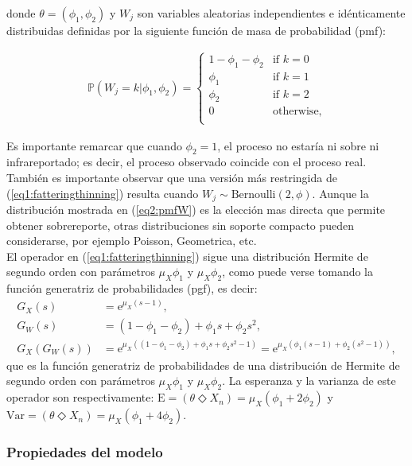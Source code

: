 \documentclass[12pt,twoside]{article} %
\begin{document}
\noindent donde $\theta=(\phi_1,\phi_2)$ y $W_j$ son variables aleatorias independientes e idénticamente distribuidas definidas por la siguiente función de masa de probabilidad (pmf):

\begin{align}\label{eq2:pmfW}
\mathbb{P}(W_j=k|\phi_1,\phi_2)=\begin{cases} 
1-\phi_1-\phi_2 & \textrm{if } k=0  \\
\phi_1 & \textrm{if } k=1  \\
\phi_2 & \textrm{if } k=2  \\
0 & \textrm{otherwise}, \\
\end{cases}
\end{align}

\noindent Es importante remarcar que cuando $\phi_2=1$, el proceso no estaría ni sobre ni infrareportado; es decir, el proceso observado coincide con el proceso real. También es importante observar que una versión más restringida de (\ref{eq1:fatteringthinning}) resulta cuando $W_j \sim \textrm{Bernoulli}(2,\phi)$. Aunque la distribución mostrada en (\ref{eq2:pmfW}) es la elección mas directa que permite obtener sobrereporte, otras distribuciones sin soporte compacto pueden considerarse, por ejemplo Poisson, Geometrica, etc. \\
El operador en (\ref{eq1:fatteringthinning}) sigue una distribución Hermite de segundo orden con parámetros $\mu_X\phi_1$ y $\mu_X\phi_2$, como puede verse tomando la función generatriz de probabilidades (pgf), es decir:
\begin{align}
G_X(s)&=\textrm{e}^{\mu_X(s-1)}, \label{eq3:pgfpox}\\
G_W(s)&=(1-\phi_1-\phi_2)+\phi_1s+\phi_2s^2, \label{eq3:pgfw}\\
G_X\left(G_W(s)\right)&=\textrm{e}^{\mu_X\left((1-\phi_1-\phi_2)+\phi_1s+\phi_2s^2-1\right)}=\textrm{e}^{\mu_X\left(\phi_1(s-1)+\phi_2(s^2-1)\right)} \label{eq3:pgffath} ,
\end{align}
que es la función generatriz de probabilidades de una distribución de Hermite de segundo orden con parámetros $\mu_X\phi_1$ y $\mu_X\phi_2$. La esperanza y la varianza de este operador son respectivamente: $\textrm{E}=\left(\theta \Diamond X_n\right)=\mu_X\left(\phi_1+2\phi_2\right)$ y $\textrm{Var}=\left(\theta \Diamond X_n\right)=\mu_X\left(\phi_1+4\phi_2\right)$.

\subsubsection{Propiedades del modelo}
\end{document}
